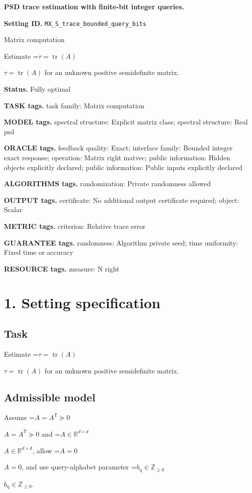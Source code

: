 \documentclass[10pt,a4paper]{article}
\newcommand{\AtlasMath}[1]{\par\begingroup\centering\setbox0=\hbox{$\displaystyle #1$}\ifdim\wd0>1.4\linewidth\typeout{ATLAS WIDE FORMULA: \the\wd0}\fi\ifdim\wd0>\linewidth\resizebox{\linewidth}{!}{\box0}\else\box0\fi\par\endgroup}
\newcommand{\AtlasInlineMath}[1]{\begingroup\setbox0=\hbox{$#1$}\ifdim\wd0>.4\linewidth\endgroup\AtlasMath{#1}\else\endgroup$#1$\fi}
\begin{document}
\raggedright

{\LARGE\bfseries\sffamily\color{AtlasNavy} PSD trace estimation with finite-bit integer queries.\par}\vspace{5pt}
\textbf{Setting ID.} \texttt{MX\_\allowbreak{}S\_\allowbreak{}trace\_\allowbreak{}bounded\_\allowbreak{}query\_\allowbreak{}bits}

Matrix computation

Estimate \AtlasInlineMath{\tau=\operatorname{tr}(A)} for an unknown positive semidefinite matrix.

\textbf{Status.} Fully optimal

\textbf{TASK tags.} task family: Matrix computation

\textbf{MODEL tags.} spectral structure: Explicit matrix class; spectral structure: Real psd

\textbf{ORACLE tags.} feedback quality: Exact; interface family: Bounded integer exact response; operation: Matrix right matvec; public information: Hidden objects explicitly declared; public information: Public inputs explicitly declared

\textbf{ALGORITHMS tags.} randomization: Private randomness allowed

\textbf{OUTPUT tags.} certificate: No additional output certificate required; object: Scalar

\textbf{METRIC tags.} criterion: Relative trace error

\textbf{GUARANTEE tags.} randomness: Algorithm private seed; time uniformity: Fixed time or accuracy

\textbf{RESOURCE tags.} measure: N right

\section{1. Setting specification}
\subsection{Task}
Estimate \AtlasInlineMath{\tau=\operatorname{tr}(A)} for an unknown positive semidefinite matrix.

\subsection{Admissible model}
Assume \AtlasInlineMath{A=A^{\mathsf T}\succeq0} and \AtlasInlineMath{A\in\mathbb{R}^{d\times d}}, allow \AtlasInlineMath{A=0}, and use query-alphabet parameter \AtlasInlineMath{b_{\mathrm{q}}\in\mathbb{Z}_{\ge0}}.
\end{document}

